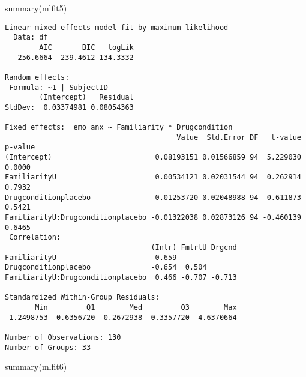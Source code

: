 \documentclass[
  man,
  longtable,
  nolmodern,
  notxfonts,
  notimes,
  colorlinks=true,linkcolor=blue,citecolor=blue,urlcolor=blue]{apa7}
\newenvironment{Shaded}{\begin{snugshade}}{\end{snugshade}}
\newcommand{\FunctionTok}[1]{\textcolor[rgb]{0.28,0.35,0.67}{#1}}
\newcommand{\NormalTok}[1]{\textcolor[rgb]{0.00,0.23,0.31}{#1}}
\begin{document}
\begin{Shaded}
\begin{Highlighting}[]
\FunctionTok{summary}\NormalTok{(mlfit5)}
\end{Highlighting}
\end{Shaded}

\begin{verbatim}
Linear mixed-effects model fit by maximum likelihood
  Data: df 
        AIC       BIC   logLik
  -256.6664 -239.4612 134.3332

Random effects:
 Formula: ~1 | SubjectID
        (Intercept)   Residual
StdDev:  0.03374981 0.08054363

Fixed effects:  emo_anx ~ Familiarity * Drugcondition 
                                        Value  Std.Error DF   t-value p-value
(Intercept)                        0.08193151 0.01566859 94  5.229030  0.0000
FamiliarityU                       0.00534121 0.02031544 94  0.262914  0.7932
Drugconditionplacebo              -0.01253720 0.02048988 94 -0.611873  0.5421
FamiliarityU:Drugconditionplacebo -0.01322038 0.02873126 94 -0.460139  0.6465
 Correlation: 
                                  (Intr) FmlrtU Drgcnd
FamiliarityU                      -0.659              
Drugconditionplacebo              -0.654  0.504       
FamiliarityU:Drugconditionplacebo  0.466 -0.707 -0.713

Standardized Within-Group Residuals:
       Min         Q1        Med         Q3        Max 
-1.2498753 -0.6356720 -0.2672938  0.3357720  4.6370664 

Number of Observations: 130
Number of Groups: 33 
\end{verbatim}

\begin{Shaded}
\begin{Highlighting}[]
\FunctionTok{summary}\NormalTok{(mlfit6)}
\end{Highlighting}
\end{Shaded}
\end{document}
